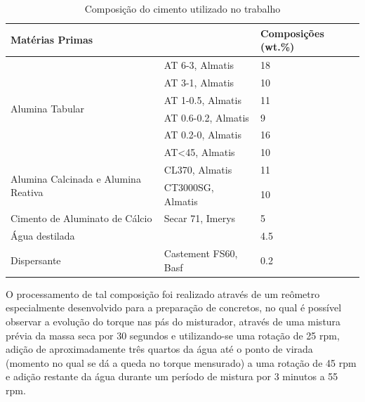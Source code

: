 \begin{table}[]
\centering
\caption{Composição do cimento utilizado no trabalho}
\label{tab:composition}
\begin{tabular}{|l|l|l|}
  \hline
  \multicolumn{2}{|l|}{Matérias Primas}                         & Composições (wt.\%) \\ \hline
  \multirow{6}{*}{Alumina Tabular}               & AT 6-3, Almatis      & 18                  \\ \cline{2-3} 
                                                                & AT 3-1, Almatis      & 10                  \\ \cline{2-3} 
                                                                & AT 1-0.5, Almatis    & 11                  \\ \cline{2-3} 
                                                                & AT 0.6-0.2, Almatis  & 9                   \\ \cline{2-3} 
                                                                & AT 0.2-0, Almatis    & 16                  \\ \cline{2-3} 
                                                                & AT<45, Almatis       & 10                  \\ \hline
  \multirow{2}{*}{Alumina Calcinada e Alumina Reativa} & CL370, Almatis      & 11                  \\ \cline{2-3} 
                                                                & CT3000SG, Almatis   & 10                  \\ \hline
  Cimento de Aluminato de Cálcio                       & Secar 71, Imerys   & 5                   \\ \hline
  Água destilada                                &            & 4.5                 \\ \hline
  Dispersante                &   Castement FS60, Basf         & 0.2                \\ \hline
\end{tabular}
\end{table}

O processamento de tal composição foi realizado através de um reômetro
especialmente desenvolvido para a preparação de concretos, no qual é possível
observar a evolução do torque nas pás do misturador, através de uma mistura
prévia da massa seca por 30 segundos e utilizando-se uma rotação de 25 rpm,
adição de aproximadamente três quartos da água até o ponto de virada (momento no
qual se dá a queda no torque mensurado) a uma rotação de 45 rpm  e adição
restante da água durante um período de mistura por 3  minutos a 55 rpm.

